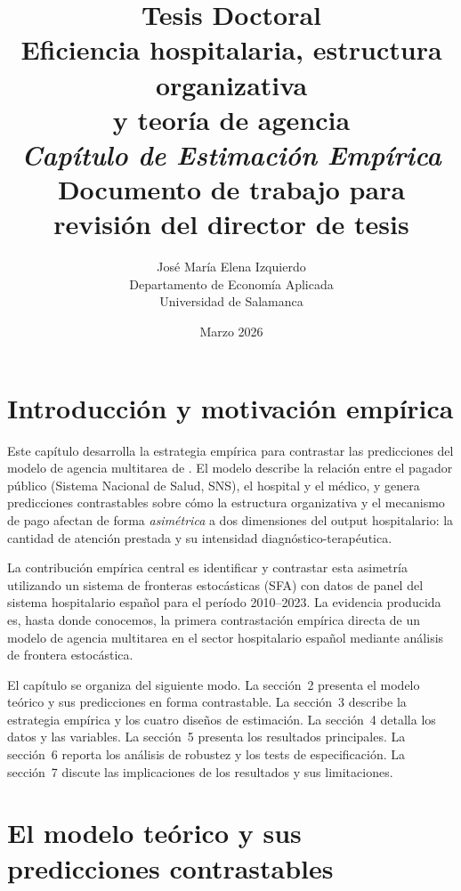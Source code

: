 \documentclass[12pt, a4paper]{article}
\title{
  \large Tesis Doctoral\\[0.3em]
  \LARGE\textbf{Eficiencia hospitalaria, estructura organizativa\\
  y teoría de agencia}\\[0.5em]
  \large\textit{Capítulo de Estimación Empírica}\\[0.3em]
  \normalsize Documento de trabajo para revisión del
  director de tesis
}
\author{José María Elena Izquierdo\\
  \small Departamento de Economía Aplicada\\
  \small Universidad de Salamanca}
\date{Marzo 2026}
\begin{document}

\maketitle
\thispagestyle{empty}
\newpage

\tableofcontents
\newpage

\section{Introducción y motivación empírica}

Este capítulo desarrolla la estrategia empírica para
contrastar las predicciones del modelo de agencia
multitarea de \citet{izquierdo2019}. El modelo describe
la relación entre el pagador público (Sistema Nacional de
Salud, SNS), el hospital y el médico, y genera
predicciones contrastables sobre cómo la estructura
organizativa y el mecanismo de pago afectan de forma
\textit{asimétrica} a dos dimensiones del output
hospitalario: la cantidad de atención prestada y su
intensidad diagnóstico-terapéutica.

La contribución empírica central es identificar y
contrastar esta asimetría utilizando un sistema de
fronteras estocásticas (SFA) con datos de panel del
sistema hospitalario español para el período 2010--2023.
La evidencia producida es, hasta donde conocemos, la
primera contrastación empírica directa de un modelo de
agencia multitarea en el sector hospitalario español
mediante análisis de frontera estocástica.

El capítulo se organiza del siguiente modo. La sección~2
presenta el modelo teórico y sus predicciones en forma
contrastable. La sección~3 describe la estrategia
empírica y los cuatro diseños de estimación. La
sección~4 detalla los datos y las variables. La
sección~5 presenta los resultados principales. La
sección~6 reporta los análisis de robustez y los tests
de especificación. La sección~7 discute las implicaciones
de los resultados y sus limitaciones.

\section{El modelo teórico y sus predicciones contrastables}
\end{document}
